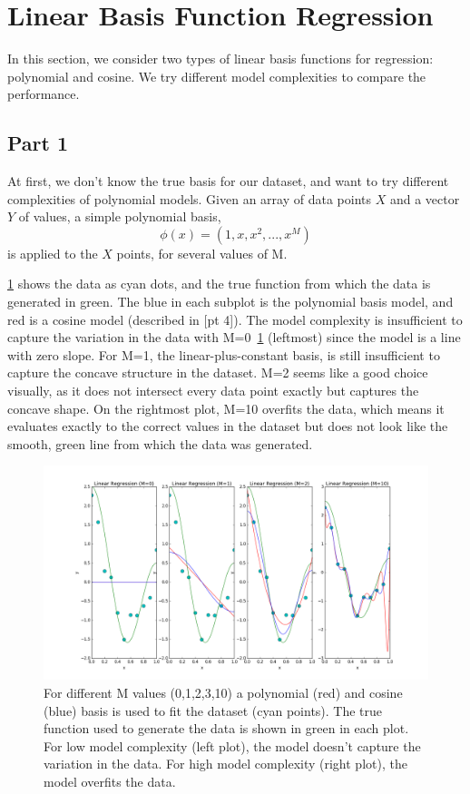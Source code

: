 \section{Linear Basis Function Regression} \label{sec:prob2}
In this section, we consider two types of linear basis functions for regression: polynomial and cosine. We try different model complexities to compare the performance.

\subsection{Part 1}
At first, we don't know the true basis for our dataset, and want to try different complexities of polynomial models.
Given an array of data points $X$ and a vector $Y$ of values, a simple polynomial basis,
\begin{equation}
	\phi(x)=(1, x, x^2, ... , x^M)
\end{equation}
is applied to the $X$ points, for several values of M.

\cref{fig:2_1_m} shows the data as cyan dots, and the true function from which the data is generated in green.
The blue in each subplot is the polynomial basis model, and red is a cosine model (described in [pt 4]).
The model complexity is insufficient to capture the variation in the data with M=0~\cref{fig:2_1_m} (leftmost) since the model is a line with zero slope.
For M=1, the linear-plus-constant basis, is still insufficient to capture the concave structure in the dataset.
M=2 seems like a good choice visually, as it does not intersect every data point exactly but captures the concave shape.
On the rightmost plot, M=10 overfits the data, which means it evaluates exactly to the correct values in the dataset but does not look like the smooth, green line from which the data was generated.


\begin{figure}
	\centering
	\includegraphics [trim=0 0 0 0, clip, angle=0, width=0.8\columnwidth,
	keepaspectratio]{figures/2_1_m}
	\caption{For different M values (0,1,2,3,10) a polynomial (red) and cosine (blue) basis is used to fit the dataset (cyan points). The true function used to generate the data is shown in green in each plot. For low model complexity (left plot), the model doesn't capture the variation in the data. For high model complexity (right plot), the model overfits the data.} 
	\label{fig:2_1_m} 
\end{figure}




